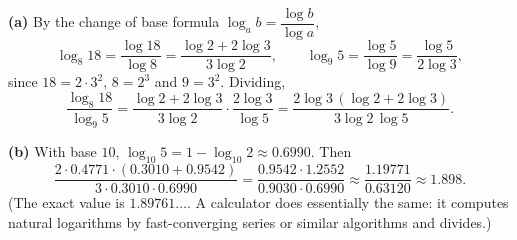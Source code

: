 \textbf{(a)} By the change of base formula $\log_ab=\dfrac{\log b}{\log a}$,
\[\log_8 18=\dfrac{\log18}{\log8}=\dfrac{\log2+2\log3}{3\log2},\qquad\log_9 5=\dfrac{\log5}{\log9}=\dfrac{\log5}{2\log3},\]
since $18=2\cdot3^2$, $8=2^3$ and $9=3^2$. Dividing,
\[\dfrac{\log_8 18}{\log_9 5}=\dfrac{\log2+2\log3}{3\log2}\cdot\dfrac{2\log3}{\log5}=\dfrac{2\log3\,(\log2+2\log3)}{3\log2\,\log5}.\]

\textbf{(b)} With base $10$, $\log_{10}5=1-\log_{10}2\approx0.6990$. Then
\[\dfrac{2\cdot0.4771\cdot(0.3010+0.9542)}{3\cdot0.3010\cdot0.6990}=\dfrac{0.9542\cdot1.2552}{0.9030\cdot0.6990}\approx\dfrac{1.19771}{0.63120}\approx\boxed{1.898}.\]
(The exact value is $1.89761\ldots$. A calculator does essentially the same: it computes natural logarithms by fast-converging series or similar algorithms and divides.)
